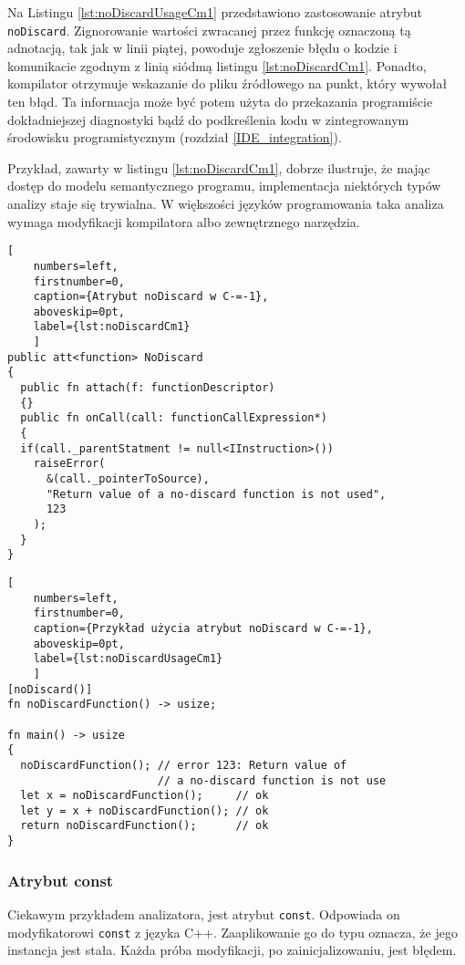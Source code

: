 Na Listingu \ref{lst:noDiscardUsageCm1} przedstawiono zastosowanie atrybut \lstinline{noDiscard}.
Zignorowanie wartości zwracanej przez funkcję oznaczoną tą adnotacją, tak jak w linii piątej, powoduje zgłoszenie błędu o kodzie i komunikacie zgodnym z linią siódmą listingu \ref{lst:noDiscardCm1}.
Ponadto, kompilator otrzymuje wskazanie do pliku źródłowego na punkt, który wywołał ten błąd.
Ta informacja może być potem użyta do przekazania programiście dokładniejszej diagnostyki bądź do podkreślenia kodu w zintegrowanym środowisku programistycznym (rozdział \ref{IDE_integration}).

Przykład, zawarty w listingu \ref{lst:noDiscardCm1}, dobrze ilustruje, że mając dostęp do modelu semantycznego programu, implementacja niektórych typów analizy staje się trywialna.
W większości języków programowania taka analiza wymaga modyfikacji kompilatora albo zewnętrznego narzędzia.

\begin{minipage}{\linewidth}
  
  \begin{lstlisting}[
    numbers=left,
    firstnumber=0,
    caption={Atrybut noDiscard w C-=-1},
    aboveskip=0pt,
    label={lst:noDiscardCm1}
    ]
public att<function> NoDiscard
{
  public fn attach(f: functionDescriptor)
  {}
  public fn onCall(call: functionCallExpression*)
  {
  if(call._parentStatment != null<IInstruction>())
    raiseError(
      &(call._pointerToSource), 
      "Return value of a no-discard function is not used",
      123
    );
  }
}
\end{lstlisting}
\end{minipage}


\begin{minipage}{\linewidth}
  
  \begin{lstlisting}[
    numbers=left,
    firstnumber=0,
    caption={Przykład użycia atrybut noDiscard w C-=-1},
    aboveskip=0pt,
    label={lst:noDiscardUsageCm1}
    ]
[noDiscard()]
fn noDiscardFunction() -> usize;

fn main() -> usize
{
  noDiscardFunction(); // error 123: Return value of
                       // a no-discard function is not use
  let x = noDiscardFunction();     // ok
  let y = x + noDiscardFunction(); // ok
  return noDiscardFunction();      // ok
}
\end{lstlisting}
\end{minipage}

\subsubsection{Atrybut const}
\label{const}
Ciekawym przykładem analizatora, jest atrybut \lstinline{const}.
Odpowiada on modyfikatorowi \lstinline{const} z języka C++.
Zaaplikowanie go do typu oznacza, że jego instancja jest stała.
Każda próba modyfikacji, po zainicjalizowaniu, jest błędem.

